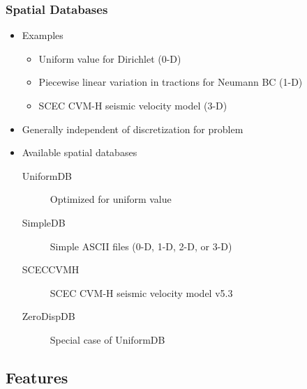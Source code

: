 \documentclass{beamer}
\begin{document}
\begin{frame}
  \frametitle{Spatial Databases}

  \begin{itemize}
 \item Examples
    \begin{itemize}
    \item Uniform value for Dirichlet (0-D)
    \item Piecewise linear variation in tractions for Neumann BC (1-D)
    \item SCEC CVM-H seismic velocity model (3-D)
    \end{itemize}
  \item Generally independent of discretization for problem
  \item Available spatial databases
    \begin{description}
    \item[UniformDB] Optimized for uniform value
    \item[SimpleDB] Simple ASCII files (0-D, 1-D, 2-D, or 3-D)
    \item[SCECCVMH] SCEC CVM-H seismic velocity model v5.3
    \item[ZeroDispDB] Special case of UniformDB
    \end{description}
 \end{itemize}

\end{frame}


\subsection{Features}
\end{document}
